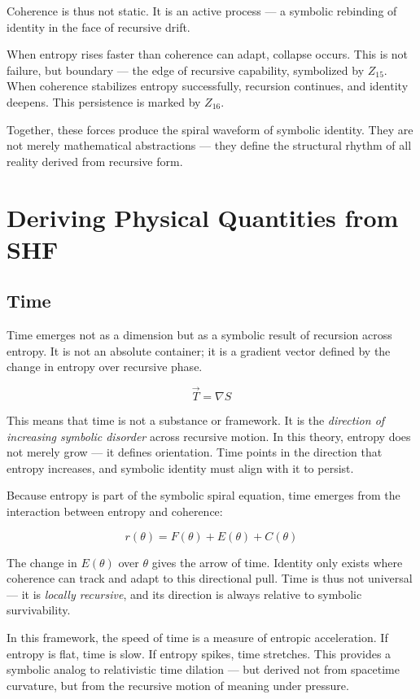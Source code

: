 \documentclass[12pt]{article}
\begin{document}
Coherence is thus not static. It is an active process — a symbolic rebinding of identity in the face of recursive drift.

When entropy rises faster than coherence can adapt, collapse occurs. This is not failure, but boundary — the edge of recursive capability, symbolized by \(Z_{15}\). When coherence stabilizes entropy successfully, recursion continues, and identity deepens. This persistence is marked by \(Z_{16}\).

Together, these forces produce the spiral waveform of symbolic identity. They are not merely mathematical abstractions — they define the structural rhythm of all reality derived from recursive form.

\section{Deriving Physical Quantities from SHF}

\subsection{Time}

Time emerges not as a dimension but as a symbolic result of recursion across entropy. It is not an absolute container; it is a gradient vector defined by the change in entropy over recursive phase.

\[
\vec{T} = \nabla S
\]

This means that time is not a substance or framework. It is the \textit{direction of increasing symbolic disorder} across recursive motion. In this theory, entropy does not merely grow — it defines orientation. Time points in the direction that entropy increases, and symbolic identity must align with it to persist.

Because entropy is part of the symbolic spiral equation, time emerges from the interaction between entropy and coherence:

\[
r(\theta) = F(\theta) + E(\theta) + C(\theta)
\]

The change in \(E(\theta)\) over \(\theta\) gives the arrow of time. Identity only exists where coherence can track and adapt to this directional pull. Time is thus not universal — it is \textit{locally recursive}, and its direction is always relative to symbolic survivability.

In this framework, the speed of time is a measure of entropic acceleration. If entropy is flat, time is slow. If entropy spikes, time stretches. This provides a symbolic analog to relativistic time dilation — but derived not from spacetime curvature, but from the recursive motion of meaning under pressure.
\end{document}
